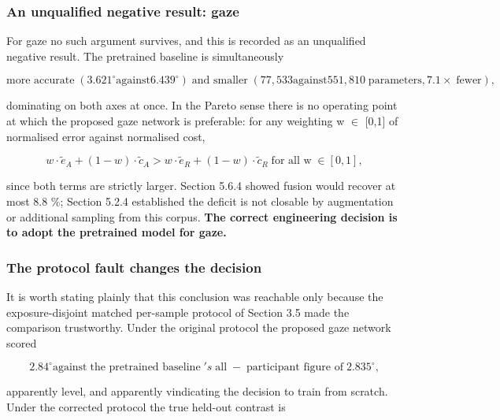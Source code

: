 \subsubsection{An unqualified negative result: gaze}

For gaze no such argument survives, and this is recorded as an unqualified negative result. The pretrained baseline is simultaneously

\begin{equation}
\label{eq:299}
\text{more accurate}\; ( 3.621^{\circ} \mathrm{against} 6.439^{\circ} ) \;\text{and smaller}\; ( 77,533 \mathrm{against} 551,810 \;\text{parameters}, 7.1\times \;\text{fewer} ) ,
\end{equation}

dominating on both axes at once. In the Pareto sense there is no operating point at which the proposed gaze network is preferable: for any weighting w $\in$ [0,1] of normalised error against normalised cost,

\begin{equation}
\label{eq:300}
w \cdot \tilde{e}_A + (1-w) \cdot \tilde{c}_A > w \cdot \tilde{e}_R + (1-w) \cdot \tilde{c}_R \;\text{for all w}\; \in [0,1] ,
\end{equation}

since both terms are strictly larger. Section 5.6.4 showed fusion would recover at most 8.8 \%; Section 5.2.4 established the deficit is not closable by augmentation or additional sampling from this corpus. \textbf{The correct engineering decision is to adopt the pretrained model for gaze.}

\subsubsection{The protocol fault changes the decision}

It is worth stating plainly that this conclusion was reachable only because the exposure-disjoint matched per-sample protocol of Section 3.5 made the comparison trustworthy. Under the original protocol the proposed gaze network scored

\begin{equation}
\label{eq:301}
2.84^{\circ} \mathrm{against} \;\text{the pretrained baseline}\;'s \;\text{all}\;-\;\text{participant figure of}\; 2.835^{\circ} ,
\end{equation}

apparently level, and apparently vindicating the decision to train from scratch. Under the corrected protocol the true held-out contrast is

